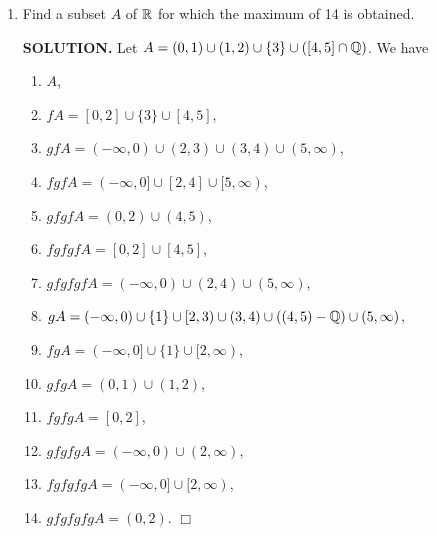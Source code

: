 \documentclass{article}
\begin{document}
\begin{enumerate}
\begin{enumerate}
            \item Find a subset $A$ of $\mathbb{R}$ for which the maximum of 14 is obtained.

            {\bf SOLUTION.} Let $A = (0, 1) \cup (1, 2) \cup \{3\} \cup ([4, 5] \cap \mathbb{Q})$. We have
            \begin{enumerate}
                \item $A$,
                \item $fA = [0, 2] \cup \{3\} \cup [4, 5]$,
                \item $gfA = (-\infty, 0) \cup (2, 3) \cup (3, 4) \cup (5, \infty)$,
                \item $fgfA = (-\infty, 0] \cup [2, 4] \cup [5, \infty)$,
                \item $gfgfA = (0, 2) \cup (4, 5)$,
                \item $fgfgfA = [0, 2] \cup [4, 5]$,
                \item $gfgfgfA = (-\infty, 0) \cup (2, 4) \cup (5, \infty)$,
                \item $gA = (-\infty, 0) \cup \{1\} \cup [2, 3) \cup (3, 4) \cup ((4, 5) - \mathbb{Q}) \cup (5, \infty)$,
                \item $fgA = (-\infty, 0] \cup \{1\} \cup [2, \infty)$,
                \item $gfgA = (0, 1) \cup (1, 2)$,
                \item $fgfgA = [0, 2]$,
                \item $gfgfgA = (-\infty, 0) \cup (2, \infty)$,
                \item $fgfgfgA = (-\infty, 0] \cup [2, \infty)$,
                \item $gfgfgfgA = (0, 2)$. $\Box$
            \end{enumerate}
        \end{enumerate}
    \end{enumerate}
\end{document}
